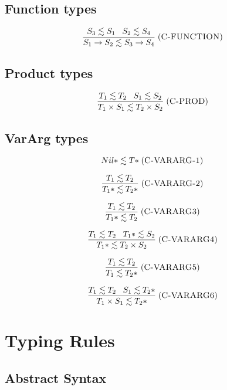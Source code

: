 \documentclass[12pt]{article}
\newcommand{\mylabel}[1]{\; (\textsc{#1})}
\begin{document}
\subsection{Function types}

\[
\frac{S_{3} \lesssim S_{1} \;\;\; S_{2} \lesssim S_{4}}
     {S_{1} \rightarrow S_{2} \lesssim S_{3} \rightarrow S_{4}}
\mylabel{C-FUNCTION}
\]

\subsection{Product types}

\[
\frac{T_{1} \lesssim T_{2} \;\;\; S_{1} \lesssim S_{2}}
     {T_{1} \times S_{1} \lesssim T_{2} \times S_{2}}
\mylabel{C-PROD}
\]

\subsection{VarArg types}

\[
{Nil*} \lesssim {T*}
\mylabel{C-VARARG-1}
\]

\[
\frac{T_{1} \lesssim T_{2}}
     {{T_{1}*} \lesssim {T_{2}*}}
\mylabel{C-VARARG-2}
\]

\[
\frac{T_{1} \lesssim T_{2}}
     {{T_{1}*} \lesssim T_{2}}
\mylabel{C-VARARG3}
\]

\[
\frac{T_{1} \lesssim T_{2} \;\;\;
      {T_{1}*} \lesssim S_{2}}
     {{T_{1}*} \lesssim T_{2} \times S_{2}}
\mylabel{C-VARARG4}
\]

\[
\frac{T_{1} \lesssim T_{2}}
     {T_{1} \lesssim {T_{2}*}}
\mylabel{C-VARARG5}
\]

\[
\frac{T_{1} \lesssim T_{2} \;\;\;
      S_{1} \lesssim {T_{2}*}}
     {T_{1} \times S_{1} \lesssim {T_{2}*}}
\mylabel{C-VARARG6}
\]

\section{Typing Rules}

\subsection{Abstract Syntax}
\end{document}
